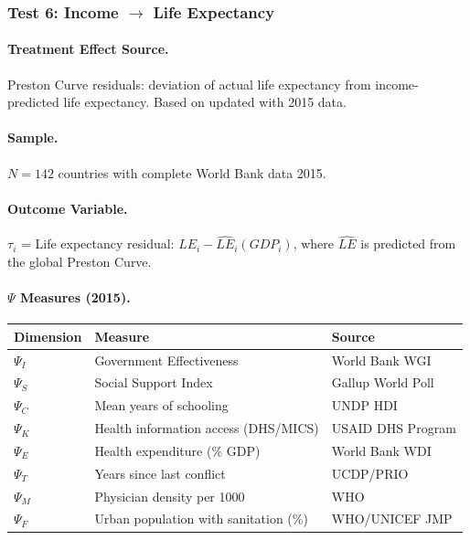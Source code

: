 \documentclass[12pt,a4paper]{article}
\begin{document}
\subsubsection{Test 6: Income $\rightarrow$ Life Expectancy}

\paragraph{Treatment Effect Source.}
Preston Curve residuals: deviation of actual life expectancy from income-predicted life expectancy. Based on \citet{preston1975changing} updated with 2015 data.

\paragraph{Sample.}
$N = 142$ countries with complete World Bank data 2015.

\paragraph{Outcome Variable.}
$\tau_i$ = Life expectancy residual: $LE_i - \hat{LE}_i(GDP_i)$, where $\hat{LE}$ is predicted from the global Preston Curve.

\paragraph{$\Psi$ Measures (2015).}
\begin{center}
\small
\begin{tabular}{@{}lll@{}}
\toprule
\textbf{Dimension} & \textbf{Measure} & \textbf{Source} \\
\midrule
$\Psi_I$ & Government Effectiveness & World Bank WGI \\
$\Psi_S$ & Social Support Index & Gallup World Poll \\
$\Psi_C$ & Mean years of schooling & UNDP HDI \\
$\Psi_K$ & Health information access (DHS/MICS) & USAID DHS Program \\
$\Psi_E$ & Health expenditure (\% GDP) & World Bank WDI \\
$\Psi_T$ & Years since last conflict & UCDP/PRIO \\
$\Psi_M$ & Physician density per 1000 & WHO \\
$\Psi_F$ & Urban population with sanitation (\%) & WHO/UNICEF JMP \\
\bottomrule
\end{tabular}
\end{center}
\end{document}
